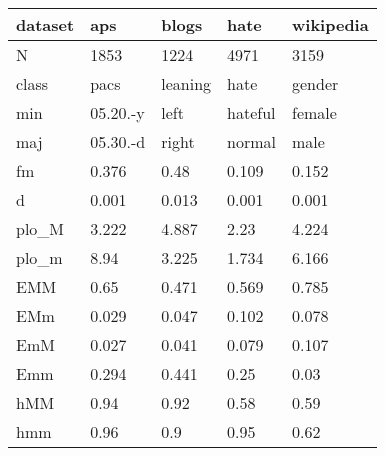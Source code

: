 \begin{tabular}{lllll}
\toprule
dataset &       aps &    blogs &     hate & wikipedia \\
\midrule
N     &      1853 &     1224 &     4971 &      3159 \\
class &      pacs &  leaning &     hate &    gender \\
min   &  05.20.-y &     left &  hateful &    female \\
maj   &  05.30.-d &    right &   normal &      male \\
fm    &     0.376 &     0.48 &    0.109 &     0.152 \\
d     &     0.001 &    0.013 &    0.001 &     0.001 \\
plo\_M &     3.222 &    4.887 &     2.23 &     4.224 \\
plo\_m &      8.94 &    3.225 &    1.734 &     6.166 \\
EMM   &      0.65 &    0.471 &    0.569 &     0.785 \\
EMm   &     0.029 &    0.047 &    0.102 &     0.078 \\
EmM   &     0.027 &    0.041 &    0.079 &     0.107 \\
Emm   &     0.294 &    0.441 &     0.25 &      0.03 \\
hMM   &      0.94 &     0.92 &     0.58 &      0.59 \\
hmm   &      0.96 &      0.9 &     0.95 &      0.62 \\
\bottomrule
\end{tabular}
